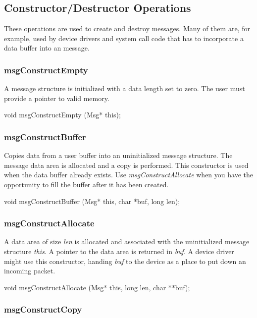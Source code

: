 \subsection{Constructor/Destructor Operations}

These operations are used to create and destroy messages. Many of
them are, for example, used by device drivers and system call code
that has to incorporate a data buffer into an \xk{} message.

\subsubsection{msgConstructEmpty}

A message structure is initialized with a data length set to zero.
The user must provide a pointer to valid memory.
\medskip

{\sem void} {\bold msgConstructEmpty} ({\sem Msg*} {\caps this});

\subsubsection{msgConstructBuffer}

Copies data from a user buffer into an uninitialized message
structure.  The message data area is allocated and a copy is
performed.  This constructor is used when the data buffer already
exists. Use {\em msgConstructAllocate} when you have the opportunity
to fill the buffer after it has been created.
\medskip

{\sem void} {\bold msgConstructBuffer} ({\sem Msg*} {\caps this},
{\sem char} *{\caps buf}, {\sem long} {\caps len});

\subsubsection{msgConstructAllocate}

A data area of size {\em len} is allocated and associated with the
uninitialized message structure {\em this}.  A pointer to the data
area is returned in {\em buf}.  A device driver might use this
constructor, handing {\em buf} to the device as a place to put down an
incoming packet.
\medskip

{\sem void} {\bold msgConstructAllocate} ({\sem Msg*} {\caps this}, {\sem long} {\caps len}, {\sem char} **{\caps buf});
\medskip

\subsubsection{msgConstructCopy}

